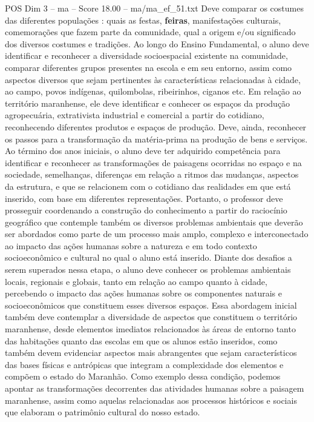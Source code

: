 \begin{textsample}{POS Dim 3 – ma – Score 18.00 – ma/ma\_ef\_51.txt}
Deve comparar os costumes das diferentes populações : quais as festas, \textbf{feiras}, manifestações culturais, comemorações que fazem parte da comunidade, qual a origem e/ou significado dos diversos costumes e tradições.
Ao longo do Ensino Fundamental, o aluno deve identificar e reconhecer a diversidade socioespacial existente na comunidade, comparar diferentes grupos presentes na escola e em seu entorno, assim como aspectos diversos que sejam pertinentes às características relacionadas à cidade, ao campo, povos indígenas, quilombolas, ribeirinhos, ciganos etc.
Em relação ao território maranhense, ele deve identificar e conhecer os espaços da produção agropecuária, extrativista industrial e comercial a partir do cotidiano, reconhecendo diferentes produtos e espaços de produção.
Deve, ainda, reconhecer os passos para a transformação da matéria-prima na produção de bens e serviços.
Ao término dos anos iniciais, o aluno deve ter adquirido competência para identificar e reconhecer as transformações de paisagens ocorridas no espaço e na sociedade, semelhanças, diferenças em relação a ritmos das mudanças, aspectos da estrutura, e que se relacionem com o cotidiano das realidades em que está inserido, com base em diferentes representações.
Portanto, o professor deve prosseguir coordenando a construção do conhecimento a partir do raciocínio geográfico que contemple também os diversos problemas ambientais que deverão ser abordados como parte de um processo mais amplo, complexo e interconectado ao impacto das ações humanas sobre a natureza e em todo contexto socioeconômico e cultural no qual o aluno está inserido.
Diante dos desafios a serem superados nessa etapa, o aluno deve conhecer os problemas ambientais locais, regionais e globais, tanto em relação ao campo quanto à cidade, percebendo o impacto das ações humanas sobre os componentes naturais e socioeconômicos que constituem esses diversos espaços.
Essa abordagem inicial também deve contemplar a diversidade de aspectos que constituem o território maranhense, desde elementos imediatos relacionados às áreas de entorno tanto das habitações quanto das escolas em que os alunos estão inseridos, como também devem evidenciar aspectos mais abrangentes que sejam característicos das bases físicas e antrópicas que integram a complexidade dos elementos e compõem o estado do Maranhão.
Como exemplo dessa condição, podemos apontar as transformações decorrentes das atividades humanas sobre a paisagem maranhense, assim como aquelas relacionadas aos processos históricos e sociais que elaboram o patrimônio cultural do nosso estado.

\end{textsample}

